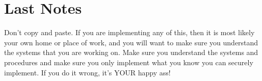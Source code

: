 \documentclass[letterpaper,twoside,12pt]{book}
\begin{document}










\appendix


%

\backmatter
\chapter{Last Notes}
Don't copy and paste.  If you are implementing any of this, then it is most
likely your own home or place of work, and you will want to make sure you
understand the systems that you are working on.  Make sure you understand the
systems and procedures and make sure you only implement what you know you can
securely implement.  If you do it wrong, it's YOUR happy ass!
\end{document}
